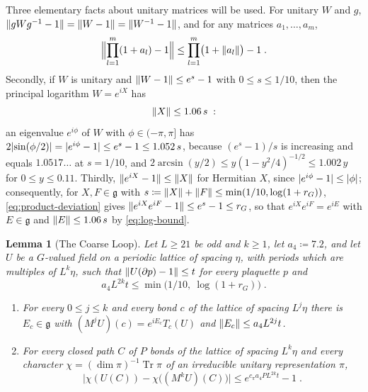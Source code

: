 \documentclass[11pt]{preprint}
\DeclarePairedDelimiter{\abs}{\lvert}{\rvert}
\DeclarePairedDelimiter{\norm}{\lVert}{\rVert}
\numberwithin{equation}{section}
\newtheorem{lemma}[theorem]{Lemma}
\theoremstyle{definition}
\theoremstyle{remark}
\theoremstyle{plain}
\begin{document}
Three elementary facts about unitary matrices will be used. For unitary $W$ and $g$, $\norm{gWg^{-1} - 1} = \norm{W - 1} = \norm{W^{-1} - 1}$, and for any matrices $a_1, \dots, a_m$,
\begin{equation}\label{eq:product-deviation}
    \Bigl\lVert\prod_{l=1}^{m}(1 + a_l) - 1\Bigr\rVert \leq \prod_{l=1}^{m}\bigl(1 + \norm{a_l}\bigr) - 1\;.
\end{equation}
Secondly, if $W$ is unitary and $\norm{W - 1} \leq e^s - 1$ with $0 \leq s \leq 1/10$, then the principal logarithm $W = e^{iX}$ has
\begin{equation}\label{eq:log-bound}
    \norm{X} \leq 1.06\,s\;:
\end{equation}
an eigenvalue $e^{i\phi}$ of $W$ with $\phi \in (-\pi, \pi]$ has $2\abs{\sin(\phi/2)} = \abs{e^{i\phi} - 1} \leq e^s - 1 \leq 1.052\,s$, because $(e^s - 1)/s$ is increasing and equals $1.0517\dots$ at $s = 1/10$, and $2\arcsin(y/2) \leq y(1 - y^2/4)^{-1/2} \leq 1.002\,y$ for $0 \leq y \leq 0.11$. Thirdly, $\norm{e^{iX} - 1} \leq \norm{X}$ for Hermitian $X$, since $\abs{e^{i\phi} - 1} \leq \abs{\phi}$; consequently, for $X, F \in \mathfrak g$ with $s \coloneqq \norm{X} + \norm{F} \leq \min(1/10, \log(1 + r_G))$, \eqref{eq:product-deviation} gives $\norm{e^{iX}e^{iF} - 1} \leq e^s - 1 \leq r_G$, so that $e^{iX}e^{iF} = e^{iE}$ with $E \in \mathfrak g$ and $\norm{E} \leq 1.06\,s$ by \eqref{eq:log-bound}.

\begin{lemma}[The Coarse Loop]\label{lem:coarse-loop}
Let $L \geq 21$ be odd and $k \geq 1$, let $a_4 \coloneqq 7.2$, and let $U$ be a $G$-valued field on a periodic lattice of spacing $\eta$, with periods which are multiples of $L^k\eta$, such that $\norm{U(\partial p) - 1} \leq t$ for every plaquette $p$ and
\begin{equation}\label{eq:chart-condition}
    a_4L^{2k}t \leq \min\bigl(1/10,\ \log(1 + r_G)\bigr)\;.
\end{equation}
\begin{enumerate}[label=(\roman*)]
\item For every $0 \leq j \leq k$ and every bond $c$ of the lattice of spacing $L^j\eta$ there is $E_c \in \mathfrak g$ with $(M^jU)(c) = e^{iE_c}T_c(U)$ and $\norm{E_c} \leq a_4L^{2j}t$.
\item For every closed path $C$ of $P$ bonds of the lattice of spacing $L^k\eta$ and every character $\chi = (\dim\pi)^{-1}\operatorname{Tr}\pi$ of an irreducible unitary representation $\pi$,
\begin{equation}\label{eq:coarse-loop}
    \bigl\lvert\chi(U(C)) - \chi\bigl((M^kU)(C)\bigr)\bigr\rvert \leq e^{c_\pi a_4PL^{2k}t} - 1\;.
\end{equation}
\end{enumerate}
\end{lemma}
\end{document}
